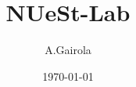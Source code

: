 \documentclass{beamer}
\title{NUeSt-Lab}
\author{A.Gairola}
\institute{Kansas State University}
\date{\today}
\begin{document}
\frame{\titlepage}

\begin{frame}
\end{frame}
\begin{frame}
\end{frame}
\end{document}
